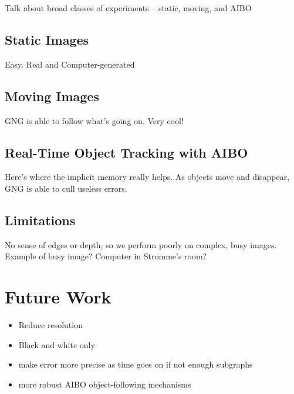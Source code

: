 \documentclass{article}
\renewcommand{\|}{\origbar} %
\begin{document}
Talk about broad classes of experiments -- static, moving, and AIBO

\subsection{Static Images}

Easy. Real and Computer-generated

\subsection{Moving Images}

GNG is able to follow what's going on. Very cool!

\subsection{Real-Time Object Tracking with AIBO}

Here's where the implicit memory really helps. As objects move and disappear, GNG is able to cull useless errors.

\subsection{Limitations}

No sense of edges or depth, so we perform poorly on complex, busy images. Example of busy image? Computer in Stromme's room?

\section{Future Work}
\label{sec:future}

\begin{itemize}
  \item Reduce resolution
  \item Black and white only
  \item make error more precise as time goes on if not enough subgraphs
  \item more robust AIBO object-following mechanisms
\end{itemize}
\end{document}
